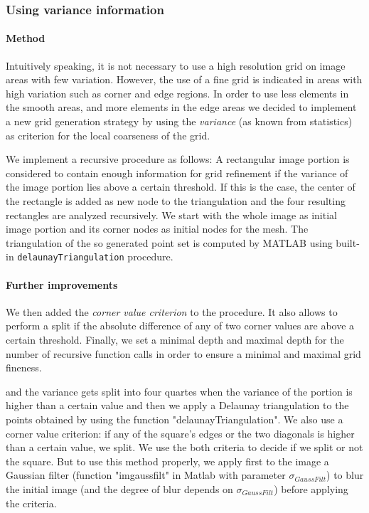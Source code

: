 \documentclass{report}
\begin{document}
\subsubsection{Using variance information}

\paragraph{Method}

Intuitively speaking, it is not necessary to use a high resolution grid on image areas with few variation. However, the use of a fine grid is indicated in areas with high variation such as corner and edge regions. In order to use less elements in the smooth areas, and more elements in the edge areas we decided to implement a new grid generation strategy by using the \emph{variance} (as known from statistics) as criterion for the local coarseness of the grid.

We implement a recursive procedure as follows: A rectangular image portion is considered to contain enough information for grid refinement if the variance of the image portion lies above a certain threshold. If this is the case, the center of the rectangle is added as new node to the triangulation and the four resulting rectangles are analyzed recursively. We start with the whole image as initial image portion and its corner nodes as initial nodes for the mesh. The triangulation of the so generated point set is computed by MATLAB using built-in \texttt{delaunayTriangulation} procedure.

\paragraph{Further improvements}

We then added the \emph{corner value criterion} to the procedure. It also allows to perform a split if the absolute difference of any of two corner values are above a certain threshold. Finally, we set a minimal depth and maximal depth for the number of recursive function calls in order to ensure a minimal and maximal grid fineness.

and the variance gets split into four quartes when the variance of the portion is higher than a certain value and then we apply a Delaunay triangulation to the points obtained by using the function "delaunayTriangulation". We also use a corner value criterion: if any of the square's edges or the two diagonals is higher than a certain value, we split. We use the both criteria to decide if we split or not the square.  But to use this method properly, we apply first to the image a Gaussian filter (function "imgaussfilt" in Matlab with parameter $\sigma_{GaussFilt}$) to blur the initial image (and the degree of blur depends on $\sigma_{GaussFilt}$) before applying the criteria.  \\
\end{document}
